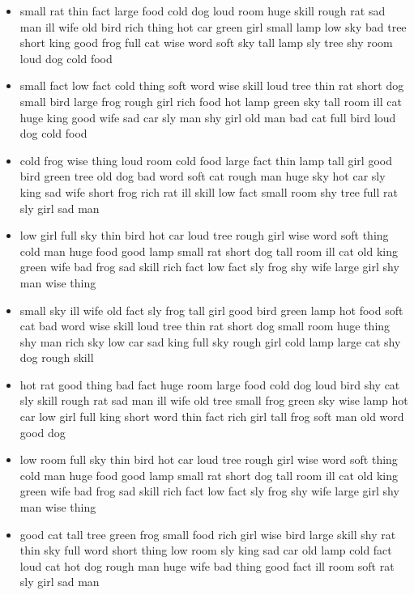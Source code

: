\documentclass[10pt,letterpaper]{article}
\begin{document}
\begin{itemize}
  \item small rat thin fact large food cold dog loud room huge skill
    rough rat sad man ill wife old bird rich thing hot car green girl
    small lamp low sky bad tree short king good frog full cat wise
    word soft sky tall lamp sly tree shy room loud dog cold food

  \item small fact low fact cold thing soft word wise skill loud tree
    thin rat short dog small bird large frog rough girl rich food hot
    lamp green sky tall room ill cat huge king good wife sad car sly
    man shy girl old man bad cat full bird loud dog cold food

  \item cold frog wise thing loud room cold food large fact thin lamp
    tall girl good bird green tree old dog bad word soft cat rough man
    huge sky hot car sly king sad wife short frog rich rat ill skill
    low fact small room shy tree full rat sly girl sad man

  \item low girl full sky thin bird hot car loud tree rough girl wise
    word soft thing cold man huge food good lamp small rat short dog
    tall room ill cat old king green wife bad frog sad skill rich fact
    low fact sly frog shy wife large girl shy man wise thing

  \item small sky ill wife old fact sly frog tall girl good bird green
    lamp hot food soft cat bad word wise skill loud tree thin rat
    short dog small room huge thing shy man rich sky low car sad king
    full sky rough girl cold lamp large cat shy dog rough skill

  \item hot rat good thing bad fact huge room large food cold dog loud
    bird shy cat sly skill rough rat sad man ill wife old tree small
    frog green sky wise lamp hot car low girl full king short word
    thin fact rich girl tall frog soft man old word good dog

  \item low room full sky thin bird hot car loud tree rough girl wise
    word soft thing cold man huge food good lamp small rat short dog
    tall room ill cat old king green wife bad frog sad skill rich fact
    low fact sly frog shy wife large girl shy man wise thing

  \item good cat tall tree green frog small food rich girl wise bird
    large skill shy rat thin sky full word short thing low room sly
    king sad car old lamp cold fact loud cat hot dog rough man huge
    wife bad thing good fact ill room soft rat sly girl sad man


\end{itemize}
\end{document}
